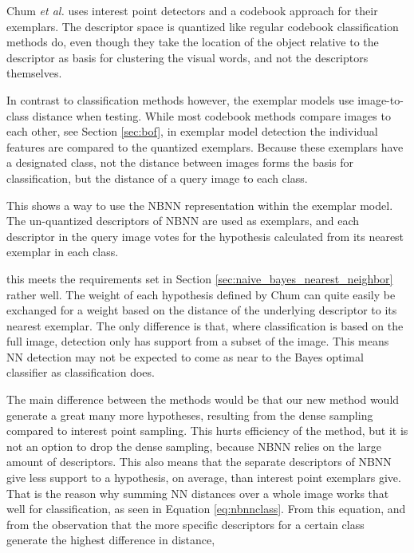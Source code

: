 \documentclass[a4paper,10pt]{article}
\begin{document}
Chum \emph{et al.}\cite{chum2007exemplar} uses interest point detectors and a codebook approach for their exemplars. The descriptor space is quantized like regular codebook classification methods do, even though they take the location of the object relative to the descriptor as basis for clustering the visual words, and not the descriptors themselves.

In contrast to classification methods however, the exemplar models use image-to-class distance when testing. While most codebook methods  compare images to each other, see Section \ref{sec:bof}, in exemplar model detection the individual features are compared to the quantized exemplars. Because these exemplars have a designated class, not the distance between images forms the basis for classification, but the distance of a query image to each class.

This shows a way to use the NBNN representation within the exemplar model. The un-quantized descriptors of NBNN are used as exemplars, and each descriptor in the query image votes for the hypothesis calculated from its nearest exemplar in each class. 



this meets the requirements set in Section \ref{sec:naive_bayes_nearest_neighbor} rather well. The weight of each hypothesis defined by Chum can quite easily be exchanged for a weight based on the distance of the underlying descriptor to its nearest exemplar. The only difference is that, where classification is based on the full image, detection only has support from a subset of the image. This means NN detection may not be expected to come as near to the Bayes optimal classifier as classification does.


The main difference between the methods would be that our new method would generate a great many more hypotheses, resulting from the dense sampling compared to interest point sampling. This hurts efficiency of the method, but it is not an option to drop the dense sampling, because NBNN relies on the large amount of descriptors. This also means that the separate descriptors of NBNN give less support to a hypothesis, on average, than interest point exemplars give. That is the reason why summing NN distances over a whole image works that well for classification, as seen in Equation \eqref{eq:nbnnclass}. From this equation, and from the observation that the more specific descriptors for a certain class generate the highest difference in distance, 
\end{document}
